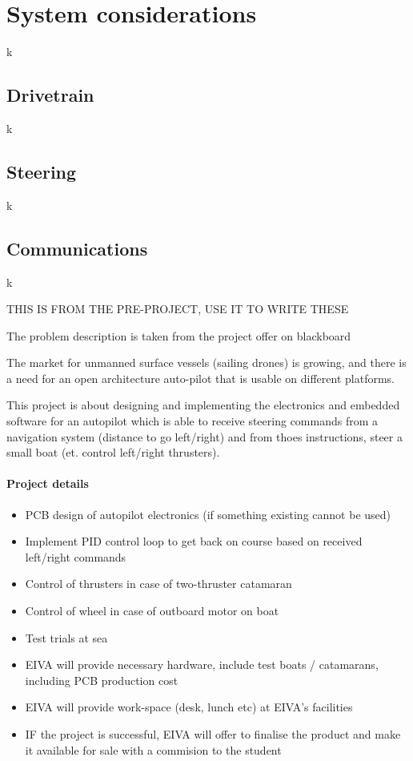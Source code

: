 \section{System considerations}
k

\subsection{Drivetrain}

k

\subsection{Steering}
k

\subsection{Communications}
k

THIS IS FROM THE PRE-PROJECT, USE IT TO WRITE THESE

The problem description is taken from the project offer on blackboard\cite{RefWorks:1}

The market for unmanned surface vessels (sailing drones) is growing, and there is a need for an open architecture auto-pilot that is usable on different platforms.

This project is about designing and implementing the electronics and embedded software for an autopilot which is able to receive steering commands from a navigation system (distance to go left/right) and from thoes instructions, steer a small boat (et. control left/right thrusters).


\paragraph{Project details}
\begin{itemize}
\item PCB design of autopilot electronics (if something existing cannot be used)
\item Implement PID control loop to get back on course based on received left/right commands
\item Control of thrusters in case of two-thruster catamaran
\item Control of wheel in case of outboard motor on boat
\item Test trials at sea
\item EIVA will provide necessary hardware, include test boats / catamarans, including PCB production cost
\item EIVA will provide work-space (desk, lunch etc) at EIVA's facilities
\item IF the project is successful, EIVA will offer to finalise the product and make it available for sale with a commision to the student
\end{itemize}